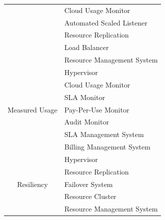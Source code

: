 \begin{table}[hbt!]
\begin{tabular}{|c|l|}
\cline{2-2}
                                                        & Cloud Usage Monitor                    \\ 
\cline{2-2}
                                                        & Automated Scaled Listener              \\ 
\cline{2-2}
                                                        & Resource Replication                   \\ 
\cline{2-2}
                                                        & Load Balancer                          \\ 
\cline{2-2}
                                                        & Resource Management System             \\ 
\hline
\multirow{7}{*}{Measured Usage}                         & Hypervisor                             \\ 
\cline{2-2}
                                                        & Cloud Usage Monitor                    \\ 
\cline{2-2}
                                                        & SLA Monitor                            \\ 
\cline{2-2}
                                                        & Pay-Per-Use Monitor                    \\ 
\cline{2-2}
                                                        & Audit Monitor                          \\ 
\cline{2-2}
                                                        & SLA Management System                  \\ 
\cline{2-2}
                                                        & Billing Management System              \\ 
\hline
\multirow{5}{*}{Resiliency}                             & Hypervisor                             \\ 
\cline{2-2}
                                                        & Resource Replication                   \\ 
\cline{2-2}
                                                        & Failover System                        \\ 
\cline{2-2}
                                                        & Resource Cluster                       \\ 
\cline{2-2}
                                                        & Resource Management System             \\
\hline
\end{tabular}
\end{table}

